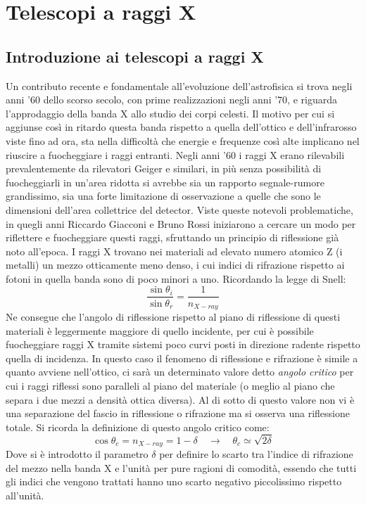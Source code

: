 \chapter{Telescopi a raggi X}

\section{Introduzione ai telescopi a raggi X}

Un contributo recente e fondamentale all'evoluzione dell'astrofisica si trova negli anni '60 dello scorso secolo, con prime realizzazioni negli anni '70, e riguarda l'approdaggio della banda X allo studio dei corpi celesti. Il motivo per cui si aggiunse così in ritardo questa banda rispetto a quella dell'ottico e dell'infrarosso viste fino ad ora, sta nella difficoltà che energie e frequenze così alte implicano nel riuscire a fuocheggiare i raggi entranti. Negli anni '60 i raggi X erano rilevabili prevalentemente da rilevatori Geiger e similari, in più senza possibilità di fuocheggiarli in un'area ridotta si avrebbe sia un rapporto segnale-rumore grandissimo, sia una forte limitazione di osservazione a quelle che sono le dimensioni dell'area collettrice del detector. Viste queste notevoli problematiche, in quegli anni Riccardo Giacconi e Bruno Rossi iniziarono a cercare un modo per riflettere e fuocheggiare questi raggi, sfruttando un principio di riflessione già noto all'epoca. I raggi X trovano nei materiali ad elevato numero atomico Z (i metalli) un mezzo otticamente meno denso, i cui indici di rifrazione rispetto ai fotoni in quella banda sono di poco minori a uno. Ricordando la legge di Snell:
\begin{equation}
    \frac{\sin\theta_i}{\sin\theta_r}=\frac{1}{n_{X-ray}}
\end{equation}
Ne consegue che l'angolo di riflessione rispetto al piano di riflessione di questi materiali è leggermente maggiore di quello incidente, per cui è possibile fuocheggiare raggi X tramite sistemi poco curvi posti in direzione radente rispetto quella di incidenza. In questo caso il fenomeno di riflessione e rifrazione è simile a quanto avviene nell'ottico, ci sarà un determinato valore detto \textit{angolo critico} per cui i raggi riflessi sono paralleli al piano del materiale (o meglio al piano che separa i due mezzi a densità ottica diversa). Al di sotto di questo valore non vi è una separazione del fascio in riflessione o rifrazione ma si osserva una riflessione totale. Si ricorda la definizione di questo angolo critico come:
\begin{equation*}
    \cos\theta_c = n_{X-ray} =
    1-\delta \quad \longrightarrow \quad
    \theta_c \simeq \sqrt{2\delta}
\end{equation*}
Dove si è introdotto il parametro $\delta$ per definire lo scarto tra l'indice di rifrazione del mezzo nella banda X e l'unità per pure ragioni di comodità, essendo che tutti gli indici che vengono trattati hanno uno scarto negativo piccolissimo rispetto all'unità.
